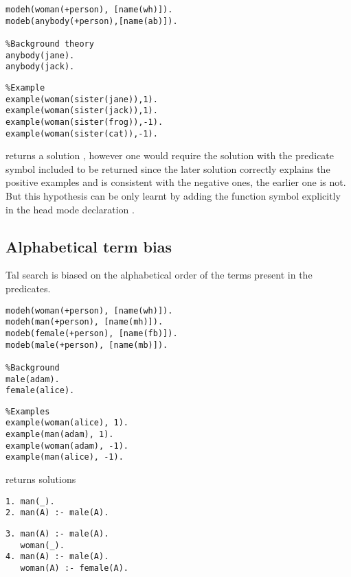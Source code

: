 \begin{minipage}[t]{.50\textwidth}
\begin{lstlisting}
modeh(woman(+person), [name(wh)]).
modeb(anybody(+person),[name(ab)]).

%Background theory
anybody(jane).
anybody(jack).
\end{lstlisting}
\end{minipage}
\begin{minipage}[t]{.20\textwidth}
\begin{lstlisting}
%Example
example(woman(sister(jane)),1).
example(woman(sister(jack)),1).
example(woman(sister(frog)),-1).
example(woman(sister(cat)),-1).
\end{lstlisting}
\end{minipage}

returns a solution , however one would require the solution  with the predicate symbol  included to be returned since the later solution correctly explains the positive examples and is consistent with the negative ones, the earlier one is not. But this hypothesis can be only learnt by adding the function symbol  explicitly in the head mode declaration .

\subsection{Alphabetical term bias}
Tal search is biased on the alphabetical order of the terms present in the predicates.

\begin{minipage}[t]{.50\textwidth}
\begin{lstlisting}
modeh(woman(+person), [name(wh)]).
modeh(man(+person), [name(mh)]).
modeb(female(+person), [name(fb)]).
modeb(male(+person), [name(mb)]).

%Background
male(adam).
female(alice).
\end{lstlisting}
\end{minipage}
\begin{minipage}[t]{.20\textwidth}
\begin{lstlisting}
%Examples
example(woman(alice), 1).
example(man(adam), 1).
example(woman(adam), -1).
example(man(alice), -1).
\end{lstlisting}
\end{minipage}

returns solutions

\begin{minipage}[t]{.50\textwidth}
\begin{lstlisting}
1. man(_).
2. man(A) :- male(A).
\end{lstlisting}
\end{minipage}
\begin{minipage}[t]{.20\textwidth}
\begin{lstlisting}
3. man(A) :- male(A).
   woman(_).
4. man(A) :- male(A).
   woman(A) :- female(A).
\end{lstlisting}
\end{minipage}

